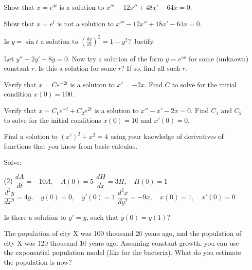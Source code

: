 \begin{exercise}
Show that $x = e^{4t}$ is a solution to $x'''-12 x'' + 48 x' - 64 x = 0$.
\end{exercise}

\begin{exercise}
Show that $x = e^{t}$ is not a solution to $x'''-12 x'' + 48 x' - 64 x = 0$.
\end{exercise}

\begin{exercise}
Is $y = \sin t$ a solution to ${\left( \frac{dy}{dt} \right)}^2 = 1 - y^2$?
Justify.
\end{exercise}

\begin{exercise}
Let $y'' + 2y' - 8y = 0$.  Now try a solution of the form $y = e^{rx}$ for
some (unknown) constant $r$.  Is this a solution
for some $r$?  If so, find all such $r$.
\end{exercise}

\begin{exercise}
Verify that $x = C e^{-2t}$ is a solution to $x' = -2x$.
Find $C$ to solve for the initial condition $x(0) = 100$.
\end{exercise}

\begin{exercise}
Verify that $x = C_1 e^{-t} + C_2 e^{2t}$ is a solution to $x'' - x' -2 x =
0$.  Find $C_1$ and $C_2$ to solve for the initial conditions $x(0) = 10$
and $x'(0) = 0$.
\end{exercise}

\begin{exercise}
Find a solution to
${(x')}^2 + x^2 = 4$
using your knowledge of derivatives of functions that you
know from basic calculus.
\end{exercise}

\begin{exercise}
Solve:
\begin{tasks}(2)
\task $\dfrac{dA}{dt} = -10 A, \quad A(0)=5$
\task $\dfrac{dH}{dx} = 3 H, \quad H(0)=1$
\task $\dfrac{d^2y}{dx^2} = 4 y, \quad y(0)=0, \quad y'(0)=1$
\task $\dfrac{d^2x}{dy^2} = -9 x, \quad x(0)=1, \quad x'(0)=0$
\end{tasks}
\end{exercise}

\begin{exercise}
Is there a solution to $y' = y$, such that $y(0) = y(1)$?
\end{exercise}

\begin{exercise}
The population of city X was 100 thousand 20 years ago, and 
the population of city X was 120 thousand 10 years ago.  Assuming constant
growth, you can use the exponential population model
(like for the bacteria).  What do you estimate the population is now?
\end{exercise}

